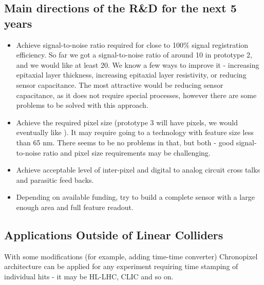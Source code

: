 \subsection{Main directions of the R\&D for the next 5 years}
\begin{itemize}
    \item Achieve signal-to-noise ratio required for close to 100\% signal registration efficiency. So far we got a signal-to-noise ratio of around 10 in prototype 2, and we would like at least 20. We know a few ways to improve it - increasing epitaxial layer thickness, increasing epitaxial layer resistivity, or reducing sensor capacitance. The most attractive would be reducing sensor capacitance, as it does not require special processes, however there are some problems to be solved with this approach.
    \item Achieve the required pixel size (prototype 3 will have \unit[25]{\micron} pixels, we would eventually like \unit[15]{\micron}). It may require going to a technology with feature size less than 65 nm. There seems to be no problems in that, but both - good signal-to-noise ratio and pixel size requirements may be challenging.
    \item Achieve acceptable level of inter-pixel and digital to analog circuit cross talks and parasitic feed backs.
    \item Depending on available funding, try to build a complete sensor with a large enough area and full feature readout.
\end{itemize}
\subsection{Applications Outside of Linear Colliders}
     With some modifications (for example, adding time-time converter) Chronopixel architecture can be applied for any experiment requiring time stamping of individual hits - it may be HL-LHC, CLIC and so on.
